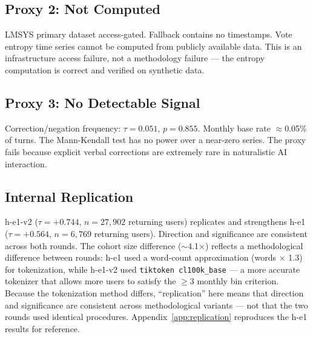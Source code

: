 \subsection{Proxy 2: Not Computed}

LMSYS primary dataset access-gated. Fallback contains no timestamps. Vote entropy time series cannot be computed from publicly available data. This is an infrastructure access failure, not a methodology failure --- the entropy computation is correct and verified on synthetic data.

\subsection{Proxy 3: No Detectable Signal}

Correction/negation frequency: $\tau = 0.051$, $p = 0.855$. Monthly base rate $\approx$0.05\% of turns. The Mann-Kendall test has no power over a near-zero series. The proxy fails because explicit verbal corrections are extremely rare in naturalistic AI interaction.

\subsection{Internal Replication}

h-e1-v2 ($\tau = +0.744$, $n = 27{,}902$ returning users) replicates and strengthens h-e1 ($\tau = +0.564$, $n = 6{,}769$ returning users). Direction and significance are consistent across both rounds. The cohort size difference ($\sim$4.1$\times$) reflects a methodological difference between rounds: h-e1 used a word-count approximation (words $\times$ 1.3) for tokenization, while h-e1-v2 used \texttt{tiktoken cl100k\_base} --- a more accurate tokenizer that allows more users to satisfy the $\geq$3 monthly bin criterion. Because the tokenization method differs, ``replication'' here means that direction and significance are consistent across methodological variants --- not that the two rounds used identical procedures. Appendix~\ref{app:replication} reproduces the h-e1 results for reference.
